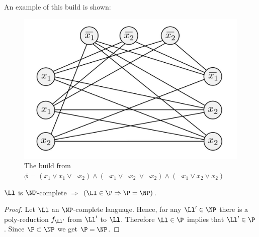 \begin{example}
An example of this build is shown:
\begin{figure}[H]
	\centering
	\includegraphics[scale=.4]{3satReduction.jpg}
	\caption{The build from $\phi = (x_1\lor x_1 \lor \neg x_2)\land (\neg x_1 \lor \neg x_2\ \lor \neg x_2) \land (\neg x_1 \lor x_2 \lor x_2) $}
\end{figure}
\end{example}
\begin{blueBox}
	\begin{thm}
		$\Ll$ is $\NP$-complete $\Rightarrow$ $(\Ll\in \P\Rightarrow \P = \NP)$.
	\end{thm}
\end{blueBox}
\begin{proof}
	Let $\Ll$ an $\NP$-complete language. Hence, for any $\Ll'\in \NP$ there is a poly-reduction $f_{\Ll'}$ from $\Ll'$ to $\Ll$. Therefore $\Ll\in \P$ implies that $\Ll'\in \P$. Since $\P\subset \NP$ we get $\P = \NP$.
\end{proof}
